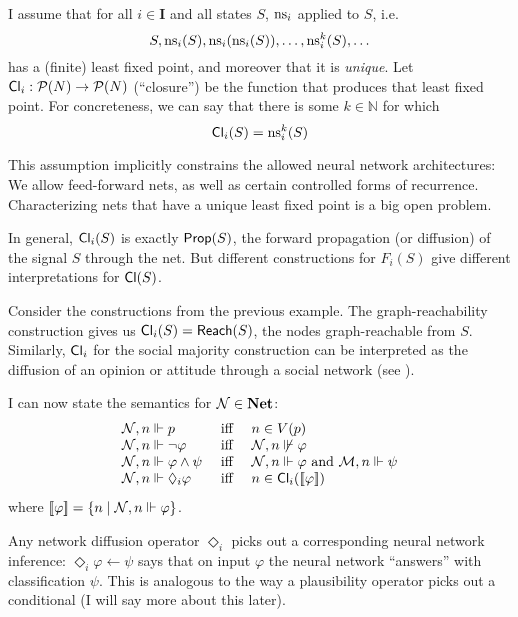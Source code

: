 \documentclass[letterpaper]{article}
\begin{document}
\begin{postulate*}
    I assume that for all $i \in \textbf{I}$ and all states $S$, $\mathrm{ns}_i$ applied to $S$, i.e.
    \[
        S, \mathrm{ns}_i(S), \mathrm{ns}_i(\mathrm{ns}_i(S)), \ldots, \mathrm{ns}^k_i(S), \ldots
    \]
    has a (finite) least fixed point, and moreover that it is \emph{unique}.  Let $\mathsf{Cl}_i : \mathcal{P}(N) \to \mathcal{P}(N)$ (``closure'') be the function that produces that least fixed point.  For concreteness, we can say that there is some $k\in \mathbb{N}$ for which
    \[
        \mathsf{Cl}_i(S) = \mathrm{ns}_i^k(S)
    \]
\end{postulate*}
This assumption implicitly constrains the allowed neural network architectures: We allow feed-forward nets, as well as certain controlled forms of recurrence.  Characterizing nets that have a unique least fixed point is a big open problem.

\begin{example*}
    In general, $\mathsf{Cl}_i(S)$ is exactly $\mathsf{Prop}(S)$, the forward propagation (or diffusion) of the signal $S$ through the net.  But different constructions for $F_i(S)$ give different interpretations for $\mathsf{Cl}(S)$.  
    
    Consider the constructions from the previous example.  The graph-reachability construction gives us $\mathsf{Cl}_i(S) = \mathsf{Reach}(S)$, the nodes graph-reachable from $S$.  Similarly, $\mathsf{Cl}_i$ for the social majority construction can be interpreted as the diffusion of an opinion or attitude through a social network (see \cite{baltag2019socialnetworks}).
\end{example*}

I can now state the semantics for $\mathcal{N} \in \textrm{\textbf{Net}}$:
\[
\begin{array}{lcl}
    \mathcal{N}, n \Vdash p & \mbox{ iff } & n \in V(p)\\
    \mathcal{N}, n \Vdash \neg \varphi & \mbox{ iff } & \mathcal{N}, n \not \Vdash \varphi\\
    \mathcal{N}, n \Vdash \varphi \land \psi & \mbox{ iff } & \mathcal{N}, n \Vdash \varphi \mbox{ and } \mathcal{M}, n \Vdash \psi\\
    \mathcal{N}, n \Vdash \Diamond_i \varphi & \mbox{ iff } & 
    n \in \mathsf{Cl}_i([\![\mbox{\em $ \varphi $\/}]\!])
\end{array}
\]
where $[\![\mbox{\em $ \varphi $\/}]\!] = \{ n \mid \mathcal{N}, n \Vdash \varphi \}$.  

Any network diffusion operator $\Diamond_i$ picks out a corresponding neural network inference: $\Diamond_i \varphi \leftarrow \psi$ says that on input $\varphi$ the neural network ``answers'' with classification $\psi$.  This is analogous to the way a plausibility operator picks out a conditional (I will say more about this later).
\end{document}
